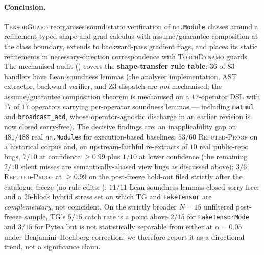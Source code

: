 \paragraph{Conclusion.}
\textsc{TensorGuard} reorganises sound static verification of
\texttt{nn.Module} classes around a refinement-typed
shape-and-grad calculus with assume/guarantee composition at
the class boundary, extends to backward-pass gradient flags,
and places its static refinements in necessary-direction
correspondence with \textsc{TorchDynamo} guards. The
mechanised audit () covers the
\textbf{shape-transfer rule table}: $36$ of $83$ handlers
have Lean soundness lemmas (the analyser implementation, AST
extractor, backward verifier, and Z3 dispatch are
\emph{not} mechanised; the assume/guarantee composition
theorem is mechanised on a $17$-operator DSL with $17$ of $17$
operators carrying per-operator soundness lemmas — including
\texttt{matmul} and \texttt{broadcast\_add}, whose
operator-agnostic discharge in an earlier revision is now
closed sorry-free).
The decisive
findings are: an inapplicability gap on $481/488$ real
\texttt{nn.Module}s for execution-based baselines; $53/60$
\textsc{Refuted-Proof} on a historical corpus and, on
upstream-faithful re-extracts of $10$ real public-repo bugs,
$7/10$ at confidence $\ge 0.99$ plus $1/10$ at lower
confidence (the remaining $2/10$ silent misses are
semantically-aliased view bugs as discussed above);
$3/6$ \textsc{Refuted-Proof} at $\ge 0.99$ on the
post-freeze hold-out filed strictly after the catalogue
freeze (no rule edits; );
$11/11$ Lean soundness lemmas closed sorry-free; and a
$25$-block hybrid stress set on which \textsc{TG} and
\texttt{FakeTensor} are \emph{complementary}, not coincident.
On the strictly broader $N{=}15$ unfiltered post-freeze
sample, \textsc{TG}'s $5/15$ catch rate is a point above
$2/15$ for \texttt{FakeTensorMode} and $3/15$ for Pytea but
is not statistically separable from either at $\alpha{=}0.05$
under Benjamini--Hochberg correction; we therefore report it
as a directional trend, not a significance claim.
